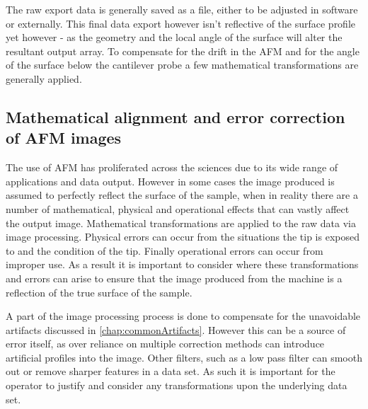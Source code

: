 The raw export data is generally saved as a file, either to be adjusted in software or externally. This final data export however isn't reflective of the surface profile yet however - as the geometry and the local angle of the surface will alter the resultant output array. To compensate for the drift in the AFM and for the angle of the surface below the cantilever probe a few mathematical transformations are generally applied.

\subsection{Mathematical alignment and error correction of AFM images}

The use of AFM has proliferated across the sciences due to its wide range of applications and data output. However in some cases the image produced is assumed to perfectly reflect the surface of the sample, when in reality there are a number of mathematical, physical and operational effects that can vastly affect the output image. Mathematical transformations are applied to the raw data via image processing. Physical errors can occur from the situations the tip is exposed to and the condition of the tip. Finally operational errors can occur from improper use. As a result it is important to consider where these transformations and errors can arise to ensure that the image produced from the machine is a reflection of the true surface of the sample.

A part of the image processing process is done to compensate for the unavoidable artifacts discussed in \autoref{chap:commonArtifacts}. However this can be a source of error itself, as over reliance on multiple correction methods can introduce artificial profiles into the image. Other filters, such as a low pass filter can smooth out or remove sharper features in a data set. As such it is important for the operator to justify and consider any transformations upon the underlying data set.


